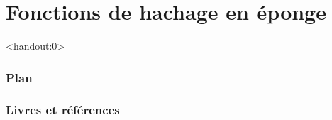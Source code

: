 \section{Fonctions de hachage en éponge}

\begin{frame}<handout:0>
  \frametitle{Plan}
  \tableofcontents[currentsection,subsectionstyle=hide]
\end{frame}

\nocite{*}


\begin{frame}[allowframebreaks]
  \frametitle{Livres et références}
  
\end{frame}

\begin{frame}
  \vfill
  \centering
  \vfill
\end{frame}
